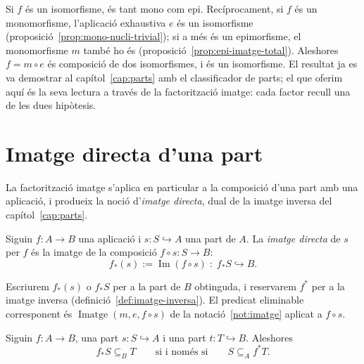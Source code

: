 \begin{prova}
Si \(f\) és un isomorfisme, és tant mono com epi. Recíprocament,
si \(f\) és un monomorfisme, l'aplicació exhaustiva \(e\) és un
isomorfisme (proposició~\ref{prop:mono-nucli-trivial}); si a més és un
epimorfisme, el monomorfisme \(m\) també ho és
(proposició~\ref{prop:epi-imatge-total}). Aleshores \(f=m\circ e\) és
composició de dos isomorfismes, i és un isomorfisme. El resultat ja es va
demostrar al capítol~\ref{cap:parts} amb el classificador de parts; el que
oferim aquí és la seva lectura a través de la factorització imatge: cada
factor recull una de les dues hipòtesis.
\end{prova}

\section{Imatge directa d'una part}\label{sec:imatge-directa}

La factorització imatge s'aplica en particular a la composició d'una part
amb una aplicació, i produeix la noció d'\emph{imatge directa}, dual de la
imatge inversa del capítol~\ref{cap:parts}.

\begin{definicio}\label{def:imatge-directa}
Siguin \(f\colon A\to B\) una aplicació i \(s\colon S\hookrightarrow A\)
una part de \(A\). La \emph{imatge directa} de \(s\) per \(f\) és la
imatge de la composició \(f\circ s\colon S\to B\):
\[
f_{*}(s):=\operatorname{Im}(f\circ s)\;\colon\; f_{*}S\hookrightarrow B.
\]
\end{definicio}

\begin{notacio}\label{not:imatge-directa}
Escriurem \(f_{*}(s)\) o \(f_{*}S\) per a la part de \(B\) obtinguda, i
reservarem \(f^{*}\) per a la imatge inversa (definició~\ref{def:imatge-inversa}).
El predicat eliminable corresponent és
\(\operatorname{Imatge}(m,e,f\circ s)\) de la notació~\ref{not:imatge}
aplicat a \(f\circ s\).
\end{notacio}

\begin{proposicio}\label{prop:adjuncio-imatges}
Siguin \(f\colon A\to B\), una part \(s\colon S\hookrightarrow A\) i una
part \(t\colon T\hookrightarrow B\). Aleshores
\[
f_{*}S\subseteq_B T
\qquad\text{si i només si}\qquad
S\subseteq_A f^{*}T.
\]
\end{proposicio}

